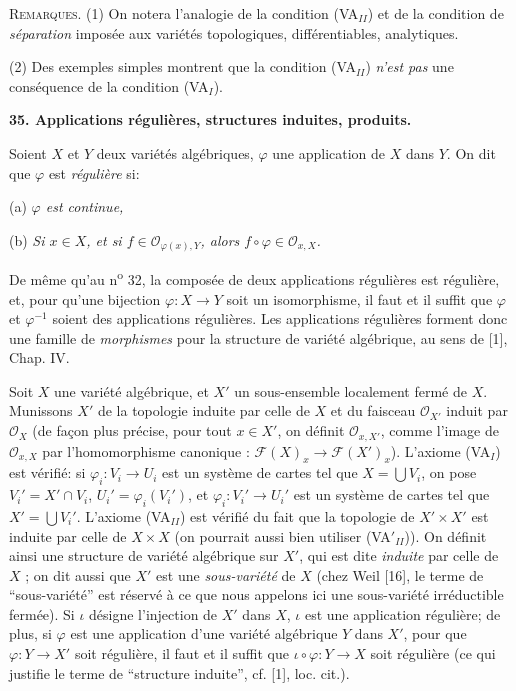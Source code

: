 \textsc{Remarques}. (1) On notera l'analogie de la condition (VA$_{II}$) et de la condition de \textit{séparation} imposée aux variétés topologiques, différentiables, analytiques.

(2) Des exemples simples montrent que la condition (VA$_{II}$) \textit{n'est pas} une conséquence de la condition (VA$_I$).


\textbf{35. Applications régulières, structures induites, produits.}

Soient $X$ et $Y$ deux variétés algébriques, $\varphi$ une application de $X$ dans $Y$. On dit que $\varphi$ est \textit{régulière} si:

(a) \textit{$\varphi$ est continue,}

(b) \textit{Si $x \in X$, et si $f \in \mathcal{O}_{\varphi(x),Y}$, alors $f \circ \varphi \in \mathcal{O}_{x,X}$.}

De même qu'au n\textsuperscript{o} 32, la composée de deux applications régulières est régulière, et, pour qu'une bijection $\varphi : X \to Y$ soit un isomorphisme, il faut et il suffit que $\varphi$ et $\varphi^{-1}$ soient des applications régulières. Les applications régulières forment donc une famille de \textit{morphismes} pour la structure de variété algébrique, au sens de [1], Chap. IV.

Soit $X$ une variété algébrique, et $X'$ un sous-ensemble localement fermé de $X$. Munissons $X'$ de la topologie induite par celle de $X$ et du faisceau $\mathcal{O}_{X'}$ induit par $\mathcal{O}_X$ (de façon plus précise, pour tout $x \in X'$, on définit $\mathcal{O}_{x,X'}$, comme l'image de $\mathcal{O}_{x,X}$ par l'homomorphisme canonique : $\mathcal{F}(X)_x \to \mathcal{F}(X')_x$). L'axiome (VA$_I$) est vérifié: si $\varphi_i : V_i \to U_i$ est un système de cartes tel que $X = \bigcup V_i$, on pose $V_i' = X' \cap V_i$, $U_i' = \varphi_i(V_i')$, et $\varphi_i : V_i' \to U_i'$ est un système de cartes tel que $X' = \bigcup V_i'$. L'axiome (VA$_{II}$) est vérifié du fait que la topologie de $X' \times X'$ est induite par celle de $X \times X$ (on pourrait aussi bien utiliser (VA$'_{II}$)). On définit ainsi une structure de variété algébrique sur $X'$, qui est dite \textit{induite} par celle de $X$ ; on dit aussi que $X'$ est une \textit{sous-variété} de $X$ (chez Weil [16], le terme de ``sous-variété'' est réservé à ce que nous appelons ici une sous-variété irréductible fermée). Si $\iota$ désigne l'injection de $X'$ dans $X$, $\iota$ est une application régulière; de plus, si $\varphi$ est une application d'une variété algébrique $Y$ dans $X'$, pour que $\varphi : Y \to X'$ soit régulière, il faut et il suffit que $\iota \circ \varphi : Y \to X$ soit régulière (ce qui justifie le terme de ``structure induite'', cf. [1], loc. cit.).

